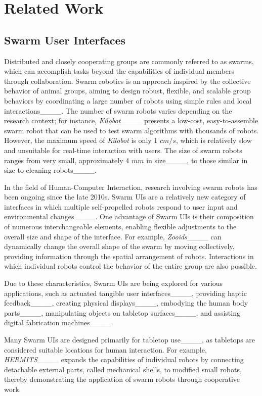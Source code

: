 \section{Related Work}
\subsection{Swarm User Interfaces}

Distributed and closely cooperating groups are commonly referred to as swarms, which can accomplish tasks beyond the capabilities of individual members through collaboration.
Swarm robotics is an approach inspired by the collective behavior of animal groups, aiming to design robust, flexible, and scalable group behaviors by coordinating a large number of robots using simple rules and local interactions____.
The number of swarm robots varies depending on the research context; for instance, \textit{Kilobot}____ presents a low-cost, easy-to-assemble swarm robot that can be used to test swarm algorithms with thousands of robots.
However, the maximum speed of \textit{Kilobot} is only 1 $cm/s$, which is relatively slow and unsuitable for real-time interaction with users.
The size of swarm robots ranges from very small, approximately 4 $mm$ in size____, to those similar in size to cleaning robots____.

In the field of Human-Computer Interaction, research involving swarm robots has been ongoing since the late 2010s.
Swarm UIs are a relatively new category of interfaces in which multiple self-propelled robots respond to user input and environmental changes____.
One advantage of Swarm UIs is their composition of numerous interchangeable elements, enabling flexible adjustments to the overall size and shape of the interface.
For example, \textit{Zooids}____ can dynamically change the overall shape of the swarm by moving collectively, providing information through the spatial arrangement of robots.
Interactions in which individual robots control the behavior of the entire group are also possible.

Due to these characteristics, Swarm UIs are being explored for various applications, such as actuated tangible user interfaces____, providing haptic feedback____, creating physical displays____, embodying the human body parts____, manipulating objects on tabletop surfaces____, and assisting digital fabrication machines____.

Many Swarm UIs are designed primarily for tabletop use____, as tabletops are considered suitable locations for human interaction.
For example, \textit{HERMITS}____ expands the capabilities of individual robots by connecting detachable external parts, called mechanical shells, to modified small robots, thereby demonstrating the application of swarm robots through cooperative work.

